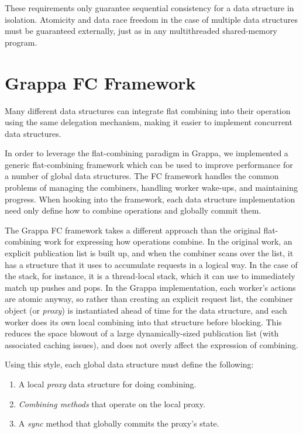 
These requirements only guarantee sequential consistency for a data structure in isolation. Atomicity and data race freedom in the case of multiple data structures must be guaranteed externally, just as in any multithreaded shared-memory program.

\section{Grappa FC Framework}
Many different data structures can integrate flat combining into their operation using the same delegation mechanism, making it easier to implement concurrent data structures.

In order to leverage the flat-combining paradigm in Grappa, we implemented a generic flat-combining framework which can be used to improve performance for a number of global data structures. The FC framework handles the common problems of managing the combiners, handling worker wake-ups, and maintaining progress. When hooking into the framework, each data structure implementation need only define how to combine operations and globally commit them.

The Grappa FC framework takes a different approach than the original flat-combining work for expressing how operations combine. In the original work, an explicit publication list is built up, and when the combiner scans over the list, it has a structure that it uses to accumulate requests in a logical way. In the case of the stack, for instance, it is a thread-local stack, which it can use to immediately match up pushes and pops. In the Grappa implementation, each worker's actions are atomic anyway, so rather than creating an explicit request list, the combiner object (or \emph{proxy}) is instantiated ahead of time for the data structure, and each worker does its own local combining into that structure before blocking. This reduces the space blowout of a large dynamically-sized publication list (with associated caching issues), and does not overly affect the expression of combining.

Using this style, each global data structure must define the following:
\begin{enumerate}
  \item A local \emph{proxy} data structure for doing combining.
  \item \emph{Combining methods} that operate on the local proxy.
  \item A \emph{sync} method that globally commits the proxy's state.
\end{enumerate}

